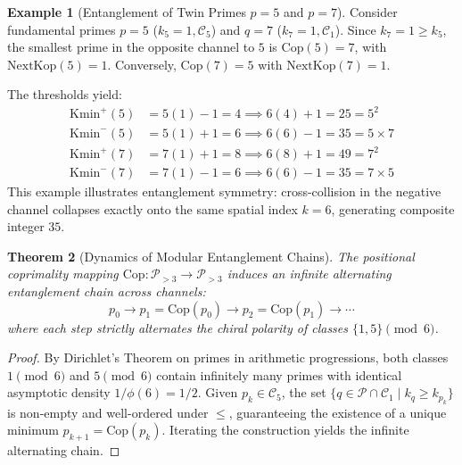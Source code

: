 \documentclass{article}
\numberwithin{equation}{section}
\theoremstyle{plain}
\newtheorem{theorem}{Theorem}[section]
\theoremstyle{definition}
\newtheorem{example}[theorem]{Example}
\begin{document}
\begin{example}[Entanglement of Twin Primes $p=5$ and $p=7$]
Consider fundamental primes $p=5$ ($k_5 = 1, \mathcal{C}_5$) and $q=7$ ($k_7 = 1, \mathcal{C}_1$). 
Since $k_7 = 1 \ge k_5$, the smallest prime in the opposite channel to $5$ is $\mathrm{Cop}(5) = 7$, with $\mathrm{NextKop}(5) = 1$. Conversely, $\mathrm{Cop}(7) = 5$ with $\mathrm{NextKop}(7) = 1$.

The thresholds yield:
\begin{align}
\mathrm{Kmin}^+(5) &= 5(1) - 1 = 4 \implies 6(4) + 1 = 25 = 5^2 \nonumber \\
\mathrm{Kmin}^-(5) &= 5(1) + 1 = 6 \implies 6(6) - 1 = 35 = 5 \times 7 \nonumber \\
\mathrm{Kmin}^+(7) &= 7(1) + 1 = 8 \implies 6(8) + 1 = 49 = 7^2 \nonumber \\
\mathrm{Kmin}^-(7) &= 7(1) - 1 = 6 \implies 6(6) - 1 = 35 = 7 \times 5 \nonumber
\end{align}
This example illustrates entanglement symmetry: cross-collision in the negative channel collapses exactly onto the same spatial index $k = 6$, generating composite integer $35$.
\end{example}

\begin{theorem}[Dynamics of Modular Entanglement Chains]
\label{thm:simetria-entrelazamiento}
The positional coprimality mapping $\mathrm{Cop}: \mathcal{P}_{>3} \to \mathcal{P}_{>3}$ induces an infinite alternating entanglement chain across channels:
\begin{equation}
p_0 \longrightarrow p_1 = \mathrm{Cop}(p_0) \longrightarrow p_2 = \mathrm{Cop}(p_1) \longrightarrow \cdots
\end{equation}
where each step strictly alternates the chiral polarity of classes $\{1, 5\} \pmod 6$.
\end{theorem}

\begin{proof}
By Dirichlet's Theorem on primes in arithmetic progressions, both classes $1 \pmod 6$ and $5 \pmod 6$ contain infinitely many primes with identical asymptotic density $1/\phi(6) = 1/2$. Given $p_k \in \mathcal{C}_5$, the set $\{q \in \mathcal{P} \cap \mathcal{C}_1 \mid k_q \ge k_{p_k}\}$ is non-empty and well-ordered under $\le$, guaranteeing the existence of a unique minimum $p_{k+1} = \mathrm{Cop}(p_k)$. Iterating the construction yields the infinite alternating chain.
\end{proof}
\end{document}
